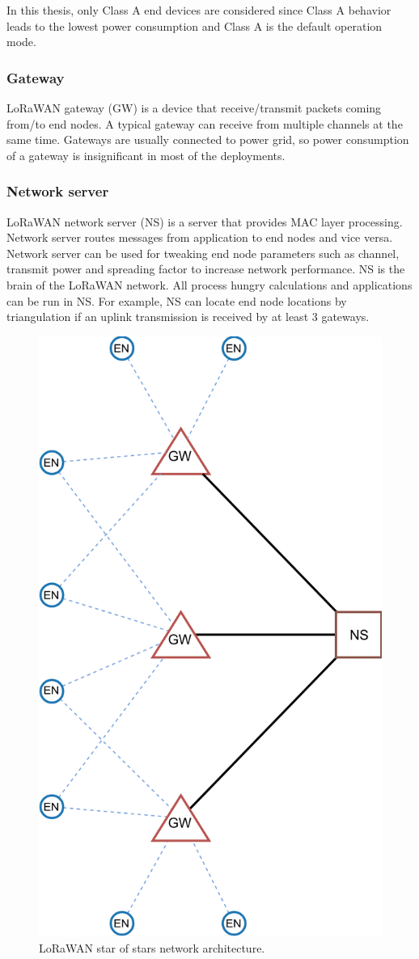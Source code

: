 In this thesis, only Class A end devices are considered since Class A behavior leads to the lowest power consumption and Class A is the default operation mode.

\subsubsection{Gateway}

LoRaWAN gateway (GW) is a device that receive/transmit packets coming from/to end nodes. A typical gateway can receive from multiple channels at the same time. Gateways are usually connected to power grid, so power consumption of a gateway is insignificant in most of the deployments.

\subsubsection{Network server}

LoRaWAN network server (NS) is a server that provides MAC layer processing. Network server routes messages from application to end nodes and vice versa. Network server can be used for tweaking end node parameters such as channel, transmit power and spreading factor to increase network performance. NS is the brain of the LoRaWAN network. All process hungry calculations and applications can be run in NS. For example, NS can locate end node locations by triangulation if an uplink transmission is received by at least 3 gateways.

\begin{figure}
\centering
\includegraphics[width=.7\linewidth]{fig/lorawan_topology.png}
\vspace*{4mm}
\caption{LoRaWAN star of stars network architecture.}
\label{fig:lorawan_topology}
\end{figure}

